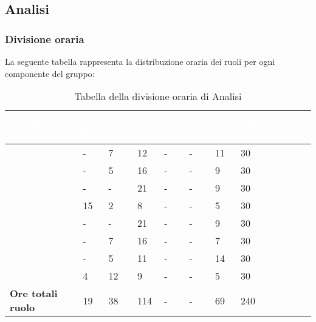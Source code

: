 \subsection{Analisi}

\subsubsection{Divisione oraria}
La seguente tabella rappresenta la distribuzione oraria dei ruoli per ogni componente del gruppo:
{
\renewcommand{\arraystretch}{2}
\begin{longtable}[h!] { C{4cm} C{1cm} C{1cm} C{1cm} C{1cm} C{1cm} C{1cm} C{3cm}}
\caption{Tabella della divisione oraria di Analisi}	\\

\textcolor{white}{\textbf{Membro del gruppo}} & 
\textcolor{white}{\textbf{RE}} & 
\textcolor{white}{\textbf{AM}} & 
\textcolor{white}{\textbf{AN}} & 
\textcolor{white}{\textbf{PT}} & 
\textcolor{white}{\textbf{PR}} & 
\textcolor{white}{\textbf{VE}} & 
\textcolor{white}{\textbf{Ore complessive}}\\	
\endhead

\MC{}                     &  - &  7 &  12 & - & - & 11 &  30 \\
\LD{}                     &  - &  5 &  16 & - & - &  9 &  30 \\
\CE{}                     &  - &  - &  21 & - & - &  9 &  30 \\
\SE{}                     & 15 &  2 &   8 & - & - &  5 &  30 \\
\PF{}                     &  - &  - &  21 & - & - &  9 &  30 \\
\DF{}                     &  - &  7 &  16 & - & - &  7 &  30 \\
\BR{}                     &  - &  5 &  11 & - & - & 14 &  30 \\
\AT{}                     &  4 & 12 &   9 & - & - &  5 &  30 \\
\textbf{Ore totali ruolo} & 19 & 38 & 114 & - & - & 69 & 240 \\

\end{longtable}
}

